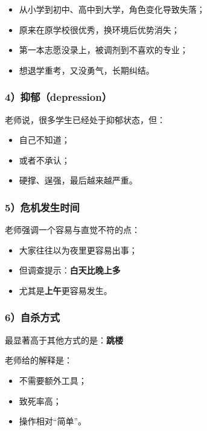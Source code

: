 \documentclass[
  chinese,
  9pt,
  a4paper,
]{ctexart}
\providecommand{\tightlist}{%
  \setlength{\itemsep}{0pt}\setlength{\parskip}{0pt}}
\begin{document}
\begin{itemize}
\tightlist
\item
  从小学到初中、高中到大学，角色变化导致失落；
\item
  原来在原学校很优秀，换环境后优势消失；
\item
  第一本志愿没录上，被调剂到不喜欢的专业；
\item
  想退学重考，又没勇气，长期纠结。
\end{itemize}

\subsubsection{4）抑郁（depression）}\label{ux6291ux90c1depression}

老师说，很多学生已经处于抑郁状态，但：

\begin{itemize}
\tightlist
\item
  自己不知道；
\item
  或者不承认；
\item
  硬撑、逞强，最后越来越严重。
\end{itemize}

\subsubsection{5）危机发生时间}\label{ux5371ux673aux53d1ux751fux65f6ux95f4}

老师强调一个容易与直觉不符的点：

\begin{itemize}
\tightlist
\item
  大家往往以为夜里更容易出事；
\item
  但调查提示：\textbf{白天比晚上多}
\item
  尤其是\textbf{上午}更容易发生。
\end{itemize}

\subsubsection{6）自杀方式}\label{ux81eaux6740ux65b9ux5f0f}

最显著高于其他方式的是：\textbf{跳楼}

老师给的解释是：

\begin{itemize}
\tightlist
\item
  不需要额外工具；
\item
  致死率高；
\item
  操作相对``简单''。
\end{itemize}
\end{document}
